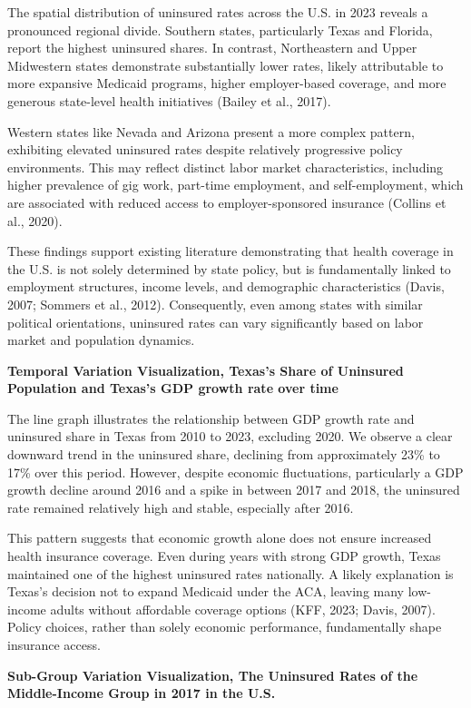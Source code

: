 \documentclass[
]{article}
\begin{document}
The spatial distribution of uninsured rates across the U.S. in 2023
reveals a pronounced regional divide. Southern states, particularly
Texas and Florida, report the highest uninsured shares. In contrast,
Northeastern and Upper Midwestern states demonstrate substantially lower
rates, likely attributable to more expansive Medicaid programs, higher
employer-based coverage, and more generous state-level health
initiatives (Bailey et al., 2017).

Western states like Nevada and Arizona present a more complex pattern,
exhibiting elevated uninsured rates despite relatively progressive
policy environments. This may reflect distinct labor market
characteristics, including higher prevalence of gig work, part-time
employment, and self-employment, which are associated with reduced
access to employer-sponsored insurance (Collins et al., 2020).

These findings support existing literature demonstrating that health
coverage in the U.S. is not solely determined by state policy, but is
fundamentally linked to employment structures, income levels, and
demographic characteristics (Davis, 2007; Sommers et al., 2012).
Consequently, even among states with similar political orientations,
uninsured rates can vary significantly based on labor market and
population dynamics.

\textbf{Temporal Variation Visualization, Texas's Share of Uninsured
Population and Texas's GDP growth rate over time}

The line graph illustrates the relationship between GDP growth rate and
uninsured share in Texas from 2010 to 2023, excluding 2020. We observe a
clear downward trend in the uninsured share, declining from
approximately 23\% to 17\% over this period. However, despite economic
fluctuations, particularly a GDP growth decline around 2016 and a spike
in between 2017 and 2018, the uninsured rate remained relatively high
and stable, especially after 2016.

This pattern suggests that economic growth alone does not ensure
increased health insurance coverage. Even during years with strong GDP
growth, Texas maintained one of the highest uninsured rates nationally.
A likely explanation is Texas's decision not to expand Medicaid under
the ACA, leaving many low-income adults without affordable coverage
options (KFF, 2023; Davis, 2007). Policy choices, rather than solely
economic performance, fundamentally shape insurance access.

\textbf{Sub-Group Variation Visualization, The Uninsured Rates of the
Middle-Income Group in 2017 in the U.S.}
\end{document}
